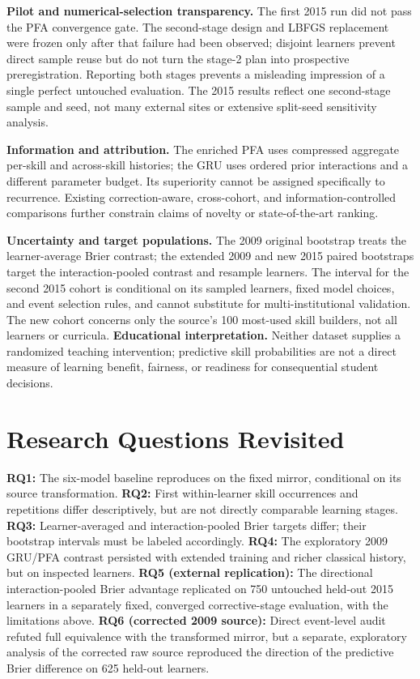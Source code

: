 \documentclass[11pt,a4paper]{article}
\begin{document}
\textbf{Pilot and numerical-selection transparency.} The first 2015 run did not pass the PFA convergence gate. The second-stage design and LBFGS replacement were frozen only after that failure had been observed; disjoint learners prevent direct sample reuse but do not turn the stage-2 plan into prospective preregistration. Reporting both stages prevents a misleading impression of a single perfect untouched evaluation. The 2015 results reflect one second-stage sample and seed, not many external sites or extensive split-seed sensitivity analysis.

\textbf{Information and attribution.} The enriched PFA uses compressed aggregate per-skill and across-skill histories; the GRU uses ordered prior interactions and a different parameter budget. Its superiority cannot be assigned specifically to recurrence. Existing correction-aware, cross-cohort, and information-controlled comparisons \citep{polydoros2026,padi2026} further constrain claims of novelty or state-of-the-art ranking.

\textbf{Uncertainty and target populations.} The 2009 original bootstrap treats the learner-average Brier contrast; the extended 2009 and new 2015 paired bootstraps target the interaction-pooled contrast and resample learners. The interval for the second 2015 cohort is conditional on its sampled learners, fixed model choices, and event selection rules, and cannot substitute for multi-institutional validation. The new cohort concerns only the source's 100 most-used skill builders, not all learners or curricula. \textbf{Educational interpretation.} Neither dataset supplies a randomized teaching intervention; predictive skill probabilities are not a direct measure of learning benefit, fairness, or readiness for consequential student decisions.

\section{Research Questions Revisited}
\textbf{RQ1:} The six-model baseline reproduces on the fixed mirror, conditional on its source transformation. \textbf{RQ2:} First within-learner skill occurrences and repetitions differ descriptively, but are not directly comparable learning stages. \textbf{RQ3:} Learner-averaged and interaction-pooled Brier targets differ; their bootstrap intervals must be labeled accordingly. \textbf{RQ4:} The exploratory 2009 GRU/PFA contrast persisted with extended training and richer classical history, but on inspected learners. \textbf{RQ5 (external replication):} The directional interaction-pooled Brier advantage replicated on 750 untouched held-out 2015 learners in a separately fixed, converged corrective-stage evaluation, with the limitations above. \textbf{RQ6 (corrected 2009 source):} Direct event-level audit refuted full equivalence with the transformed mirror, but a separate, exploratory analysis of the corrected raw source reproduced the direction of the predictive Brier difference on 625 held-out learners.
\end{document}
